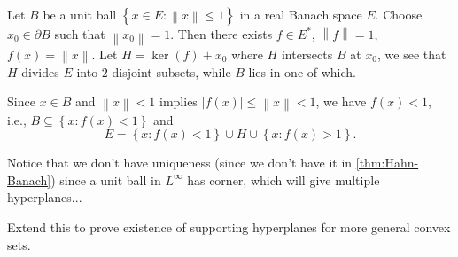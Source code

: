 \begin{remark}
	Let \(B\) be a unit ball \(\left\{ x\in E \colon \left\lVert x\right\rVert \leq 1\right\} \) in a real Banach space \(E\). Choose \(x_0 \in \partial B\) such that \(\left\lVert x_0\right\rVert = 1\). Then there exists \(f\in E^{\ast} \), \(\left\lVert f\right\rVert = 1\), \(f(x) = \left\lVert x\right\rVert \). Let \(H = \ker(f) + x_0\) where \(H\) intersects \(B\) at \(x_0\), we see that \(H\) divides \(E\) into \(2\) disjoint subsets, while \(B\) lies in one of which.
\end{remark}
\begin{explanation}
	Since \(x\in B\) and \(\left\lVert x\right\rVert < 1\) implies \(\left\vert f(x) \right\vert \leq \left\lVert x\right\rVert < 1\), we have \(f(x) < 1\), i.e., \(B\subseteq \left\{ x\colon f(x) < 1 \right\} \) and
	\[
		E = \left\{ x\colon f(x) < 1 \right\} \cup H \cup \left\{ x\colon f(x) > 1 \right\}.
	\]
\end{explanation}

\begin{note}
	Notice that we don't have uniqueness (since we don't have it in \autoref{thm:Hahn-Banach}) since a unit ball in \(L^{\infty } \) has corner, which will give multiple hyperplanes...
\end{note}

Extend this to prove existence of supporting hyperplanes for more general convex sets.